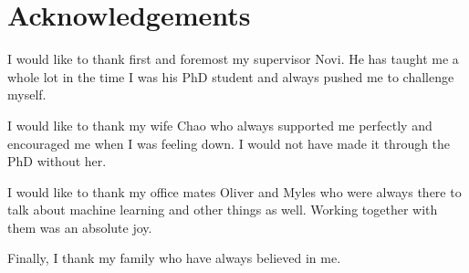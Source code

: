 

\begingroup
\let\clearpage\relax
\let\cleardoublepage\relax
\let\cleardoublepage\relax
\chapter*{Acknowledgements}
I would like to thank first and foremost my supervisor Novi.
He has taught me a whole lot in the time I was his PhD student and always pushed me to challenge myself.

I would like to thank my wife Chao who always supported me perfectly
and encouraged me when I was feeling down.
I would not have made it through the PhD without her.

I would like to thank my office mates Oliver and Myles
who were always there to talk about machine learning and other things as well.
Working together with them was an absolute joy.

Finally, I thank my family who have always believed in me.

\endgroup
